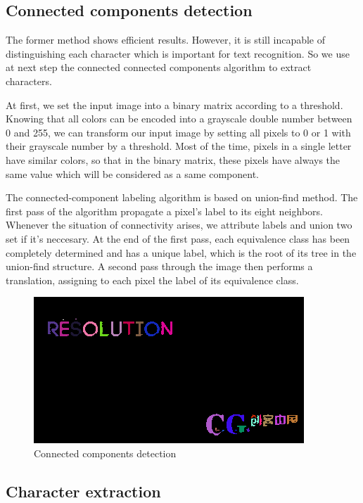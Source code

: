 \documentclass[paper=a4, french, 11pt]{scrartcl}
\begin{document}
\subsection{Connected components detection}
The former method shows efficient results. However, it is still incapable of distinguishing each character which is important for text recognition. So we use at next step the connected connected components algorithm to extract characters.

At first, we set the input image into a binary matrix according to a threshold. Knowing that all colors can be encoded into a grayscale double number between 0 and 255, we can transform our input image by setting all pixels to 0 or 1 with their grayscale number by a threshold. Most of the time, pixels in a single letter have similar colors, so that in the binary matrix, these pixels have always the same value which will be considered as a same component.

The connected-component labeling algorithm is based on union-find method. The first pass of the algorithm propagate a pixel's label to its eight neighbors. Whenever the situation of connectivity arises, we attribute labels and union two set if it's neccesary. At the end of the first pass, each equivalence class has been completely determined and has a unique label, which is the root of its tree in the union-find structure. A second pass through the image then performs a translation, assigning to each pixel the label of its equivalence class.

\begin{figure}[h]
\begin{center}
   \includegraphics[width=0.75\linewidth]{connected_components_example.png}
\end{center}
\vspace{-4ex}
\caption{Connected components detection}
\label{fig:heatmap}
\end{figure}

\subsection{Character extraction}
\end{document}
